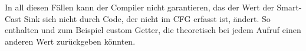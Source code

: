 In all diesen Fällen kann der Compiler nicht garantieren, das der Wert der Smart-Cast Sink sich nicht durch Code,
der nicht im CFG erfasst ist, ändert.
So enthalten  und  zum Beispiel custom Getter, die theoretisch bei jedem Aufruf einen
anderen Wert zurückgeben könnten.

\renewcommand{\kapitelautor}{}
